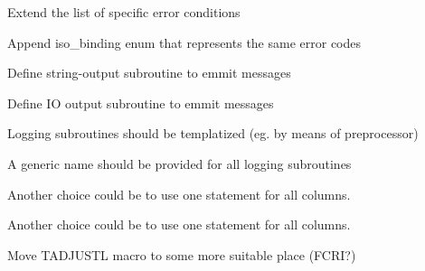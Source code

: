 
\begin{DoxyRefList}
\item[Module \mbox{\hyperlink{namespacecrierrcodes}{crierrcodes}} ]\label{todo__todo000001}%
%
Extend the list of specific error conditions 



Append iso\+\_\+binding enum that represents the same error codes 



Define string-\/output subroutine to emmit messages 



Define IO output subroutine to emmit messages  
\item[Module \mbox{\hyperlink{namespacecrilog}{crilog}} ]\label{todo__todo000002}%
%
Logging subroutines should be templatized (eg. by means of preprocessor) 



A generic name should be provided for all logging subroutines  
\item[Subprogram \mbox{\hyperlink{namespacedmcresultfileoutput_a2714cdcd072692ed4c404696da5eedb2}{dmcresultfileoutput\+::writedata}} (iounit, data, column\+\_\+widths, data\+\_\+formats)]\label{todo__todo000007}%
%
Another choice could be to use one statement for all columns. 

\label{todo__todo000008}%
%
Another choice could be to use one statement for all columns.  
\item[Subprogram \mbox{\hyperlink{namespacedmcresultfileoutput_acd9efadc98ad67a15029255c352f87ba}{dmcresultfileoutput\+::writeresultfile}} (iounit, data, column\+\_\+names, column\+\_\+widths, use\+\_\+column\+\_\+numbers, data\+\_\+formats)]\label{todo__todo000006}%
%
Move TADJUSTL macro to some more suitable place (FCRI?) 
\end{DoxyRefList}